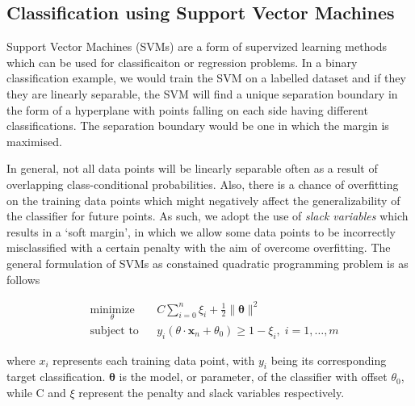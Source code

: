 \documentclass[12pt]{article}
\begin{document}
	\subsection{Classification using Support Vector Machines}	
	\label{subsection:svm}
	Support Vector Machines (SVMs) are a form of supervized learning methods which can be used for classificaiton or regression problems. In a binary classification example, we would train the SVM on a labelled dataset and if they they are linearly separable, the SVM will find a unique separation boundary in the form of a hyperplane with points falling on each side having different classifications. The separation boundary would be one in which the margin is maximised. 

	In general, not all data points will be linearly separable often as a result of overlapping class-conditional probabilities. Also, there is a chance of overfitting on the training data points which might negatively affect the generalizability of the classifier for future points. As such, we adopt the use of \textit{slack variables} which results in a `soft margin', in which we allow some data points to be incorrectly misclassified with a certain penalty with the aim of overcome overfitting. The general formulation of SVMs as constained quadratic programming problem is as follows

	\begin{equation*}
	\label{equation:svm}
	\begin{aligned}
	& \underset{\theta}{\text{minimize}}
	& & C\sum_{i=0}^n\xi_{i} + \frac{1}{2} \parallel\mathbf{\theta}\parallel^{2}  \\
	& \text{subject to}
	& & y_{i}(\theta\cdot\mathbf{x}_{n}+\theta_{0}) \ge 1 - \xi_{i}, \; i = 1, \ldots, m
	\end{aligned}
	\end{equation*}

	where $x_{i}$ represents each training data point, with $y_{i}$ being its corresponding target classification. $\mathbf{\theta}$ is the model, or parameter, of the classifier with offset $\theta_{0}$, while C and $\xi$ represent the penalty and slack variables respectively.
	
\end{document}
